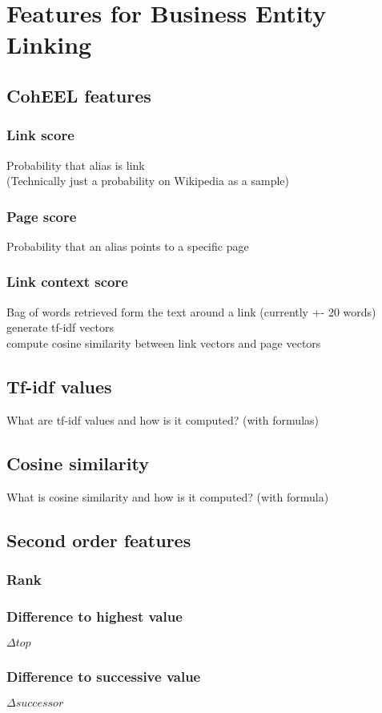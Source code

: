 \section{Features for Business Entity Linking}
\label{sec:features}
\subsection{CohEEL features}
\label{sec:coheel}

\subsubsection{Link score}
\label{sec:link_score}
Probability that alias is link\\
(Technically just a probability on Wikipedia as a sample)

\subsubsection{Page score}
\label{sec:page_score}
Probability that an alias points to a specific page

\subsubsection{Link context score}
\label{sec:context_score}
Bag of words retrieved form the text around a link (currently +- 20 words)\\
generate tf-idf vectors\\
compute cosine similarity between link vectors and page vectors

\subsection{Tf-idf values}
What are tf-idf values and how is it computed? (with formulas)\\

\subsection{Cosine similarity}
What is cosine similarity and how is it computed? (with formula)\\

\subsection{Second order features}
\subsubsection{Rank}
\subsubsection{Difference to highest value}
$\Delta top$
\subsubsection{Difference to successive value}
$\Delta successor$